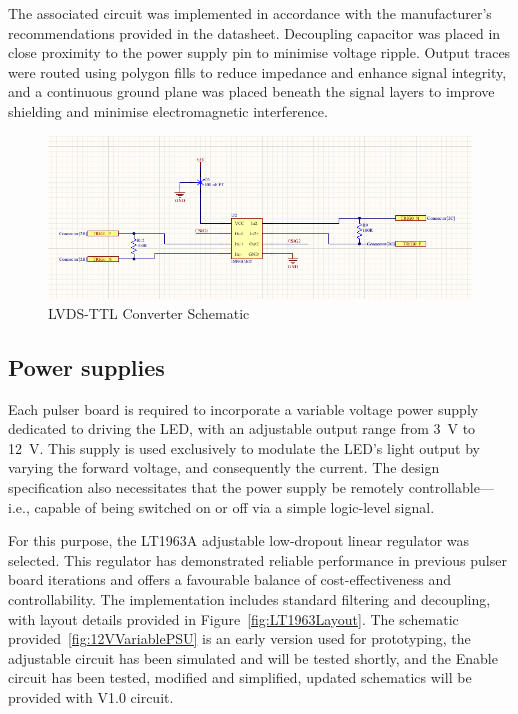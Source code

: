 \documentclass[a4paper,11pt]{article}
\begin{document}
The associated circuit was implemented in accordance with the manufacturer's recommendations provided in the datasheet. Decoupling capacitor was placed in close proximity to the power supply pin to minimise voltage ripple. Output traces were routed using polygon fills to reduce impedance and enhance signal integrity, and a continuous ground plane was placed beneath the signal layers to improve shielding and minimise electromagnetic interference.

\begin{figure}[htbp]
\centering
\includegraphics[scale=0.5]{LVDS-TTL Converter.png}
\caption{LVDS-TTL Converter Schematic\label{fig:i}}
\end{figure}


\subsection{Power supplies}

Each pulser board is required to incorporate a variable voltage power supply dedicated to driving the LED, with an adjustable output range from 3~V to 12~V. This supply is used exclusively to modulate the LED’s light output by varying the forward voltage, and consequently the current. The design specification also necessitates that the power supply be remotely controllable—i.e., capable of being switched on or off via a simple logic-level signal.

For this purpose, the LT1963A \cite{LT1963} adjustable low-dropout linear regulator was selected. This regulator has demonstrated reliable performance in previous pulser board iterations and offers a favourable balance of cost-effectiveness and controllability. The implementation includes standard filtering and decoupling, with layout details provided in Figure~\ref{fig:LT1963Layout}. The schematic provided~\ref{fig:12VVariablePSU} is an early version used for prototyping, the adjustable circuit has been simulated and will be tested shortly, and the Enable circuit has been tested, modified and simplified, updated schematics will be provided with V1.0 circuit.
\end{document}

